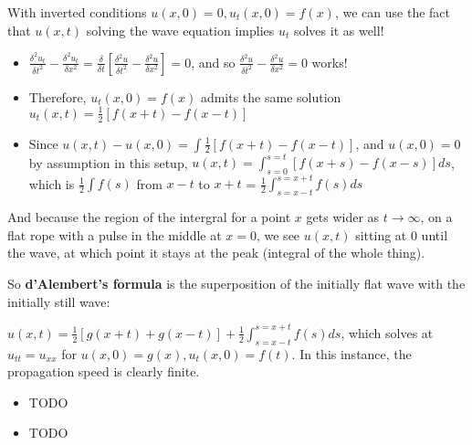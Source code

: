\documentclass[11pt, oneside]{article}   	%
\begin{document}
With inverted conditions $u(x, 0) = 0, u_t(x,0) = f(x)$, we can use the fact that $u(x,t)$ solving the wave equation implies $u_t$ solves it as well!

\begin{itemize}
\item $\frac{\delta^2u_t}{\delta t^2} - \frac{\delta^2u_t}{\delta x^2}  = \frac{\delta}{\delta t}[\frac{\delta^2u}{\delta t^2} - \frac{\delta^2u}{\delta x^2}] = 0$, and so $\frac{\delta^2u}{\delta t^2} - \frac{\delta^2u}{\delta x^2} = 0$ works!
\item Therefore, $u_t(x,0) = f(x)$ admits the same solution $u_t(x,t) = \frac{1}{2} [f(x+t) - f(x-t)]$
\item Since $u(x,t) - u(x,0)  = \int  \frac{1}{2} [f(x+t) - f(x-t)]$, and $u(x,0) =  0$ by assumption in this setup, 
$u(x,t) = \int_{s=0}^{s=t} [f(x+s) - f(x-s)]ds$, which is $\frac{1}{2} \int f(s)$ from $x-t$ to $x+t$  = $\frac{1}{2}\int_{s=x-t}^{s=x+t} f(s)ds$
\end{itemize}

And because the region of the intergral for a point $x$ gets wider as $t \rightarrow \infty$, on a flat rope with a pulse in the middle at $x=0$, we see $u(x,t)$ sitting at $0$ until the wave, at which point it stays at the peak (integral of the whole thing).

So \textbf{d'Alembert's formula} is the superposition of the initially flat wave with the initially still wave:

\mbox{$u(x,t) = \frac{1}{2}[g(x+t) + g(x-t)] + \frac{1}{2}\int_{s=x-t}^{s=x+t} f(s)ds$}, which solves at $u_{tt} = u_{xx}$ for $u(x,0) = g(x), u_t(x,0) = f(t)$.  In this instance, the propagation speed is clearly finite.

\begin{itemize}
\item TODO
\end{itemize}


\begin{itemize}
\item TODO
\end{itemize}
\end{document}
